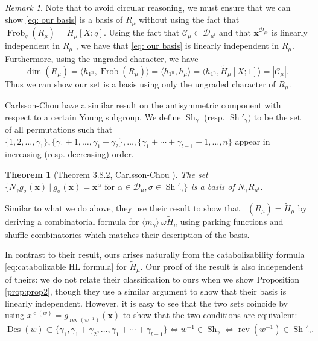 \documentclass[10pt]{amsart}
\theoremstyle{plain}
\theoremstyle{definition}
\theoremstyle{plain}
\theoremstyle{plain}
\theoremstyle{remark}
\newtheorem{rema}[rema]{Remark}
\theoremstyle{plain}
\newtheorem{thm}[thm]{Theorem}
\theoremstyle{plain}
\DeclareMathOperator{\Frob}{Frob}
\DeclareMathOperator{\sh}{Sh}
\DeclareMathOperator{\rev}{rev}
\DeclareMathOperator{\cw}{c}
\DeclareMathOperator{\des}{Des}
\DeclareMathOperator{\Frobq}{\Frob_q}
\newcommand{\mHL}{\tilde{H}}
\begin{document}
\begin{rema}
    Note that to avoid circular reasoning, we must ensure that we can show \eqref{eq: our basis} is a basis of $R_\mu$ without using the fact that $\Frob_q(R_\mu) =\mHL_\mu[X;q]$. Using the fact that $\mathcal{C}_\mu\subset \mathcal{D}_{\mu^t}$ and that $\mathbf{x}^{\mathcal{D}_{\mu^t}}$ is linearly independent in $R_\mu$ \cite[Corollary 3.14]{CC}, we have that \eqref{eq: our basis} is linearly independent in $R_\mu$. Furthermore, using the ungraded character, we have
    \[\dim(R_\mu) = \langle h_{1^n}, \Frob(R_\mu)\rangle = \langle h_{1^n}, h_\mu \rangle = \langle h_{1^n}, \tilde{H}_\mu[X;1] \rangle =|\mathcal{C}_\mu|. \]
    Thus we can show our set is a basis using only the ungraded character of $R_\mu$.
\end{rema}

Carlsson-Chou \cite{CC} have a similar result on the antisymmetric component with respect to a certain Young subgroup. 
We define $\sh_\gamma$ (resp. $\sh'_\gamma)$ to be the set of all permutations such that $\{1,2,\dots, \gamma_1\}, \{\gamma_1+1,\dots, \gamma_1+\gamma_2\}, \dots, \{\gamma_1+\cdots + \gamma_{l-1} + 1, \dots, n\}$ appear in increasing (resp. decreasing) order.

\begin{thm}[Theorem 3.8.2, Carlsson-Chou \cite{CC}]
    The set $\{N_\gamma g_\sigma(\mathbf{x}) \ | \  g_\sigma(\mathbf{x}) = \mathbf{x}^\alpha \text{ for }\alpha\in \mathcal{D}_\mu, \sigma \in \sh'_{\gamma}\}$ is a basis of $N_\gamma R_{\mu^t}$.
\end{thm}
Similar to what we do above, they use their result to show that $\Frobq(R_{\mu}) = \mHL_{\mu}$ by deriving a combinatorial formula for $\langle m_\gamma\rangle  \  \omega \mHL_{\mu}$ using parking functions and shuffle combinatorics which matches their description of the basis.

In contrast to their result, ours arises naturally from the catabolizability formula \eqref{eq:catabolizable HL formula} for $\mHL_{\mu}$. 
Our proof of the result is also independent of theirs: we do not relate their classification to ours when we show Proposition \ref{prop:prop2}, though they use a similar argument to show that their basis is linearly independent. 
However, it is easy to see that the two sets coincide by using $x^{\cw(w)} = g_{\rev(w^{-1})}(\mathbf{x})$ to show that the two conditions are equivalent:
\[\des(w) \subset \{\gamma_1,\gamma_1 + \gamma_2, \dots, \gamma_1 + \cdots + \gamma_{l-1}\} \Leftrightarrow w^{-1} \in \sh_\gamma  \Leftrightarrow \rev(w^{-1}) \in \sh'_\gamma.\]
\end{document}
